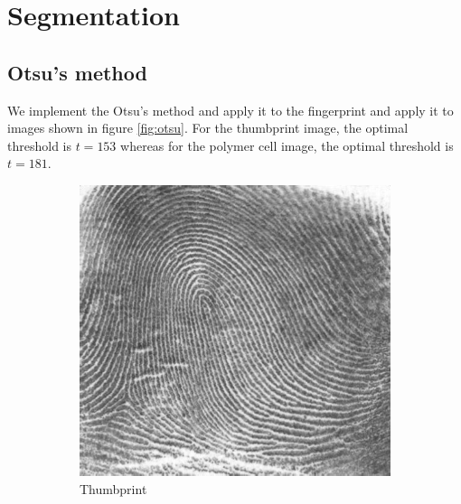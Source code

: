 \documentclass[]{article}
\begin{document}
\section{Segmentation}
\subsection{Otsu's method}
We implement the Otsu's method and apply it to the fingerprint and apply it to images shown in figure \ref{fig:otsu}. For the thumbprint image, the optimal threshold is $t=153$ whereas for the polymer cell image, the optimal threshold is $t=181$.
\begin{figure}[H]
    \centering
    \begin{subfigure}{0.25\textwidth}
        \centering
        \includegraphics[width=\textwidth]{img/before/thumbprint}
        \caption{Thumbprint}
    \end{subfigure}%
    ~
    \begin{subfigure}{0.25\textwidth}
        \centering

\end{subfigure}
\end{figure}
\end{document}
